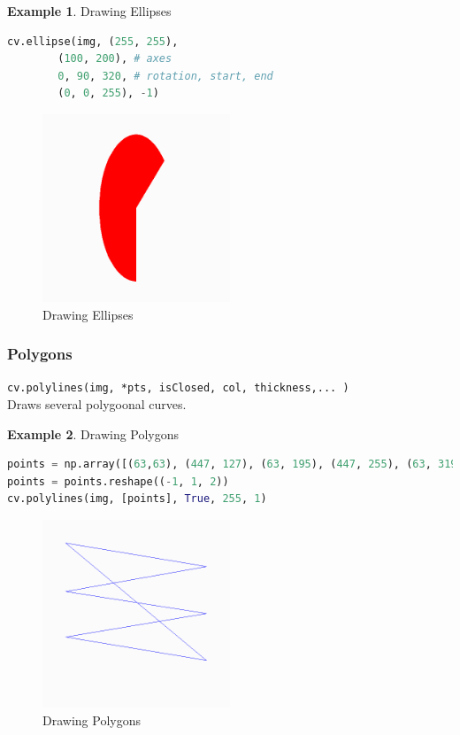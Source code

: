 \documentclass{article}
\theoremstyle{definition}
\newtheorem{ex}{Example}[subsection]
\theoremstyle{remark}
\newcommand{\func}[2]{\noindent\lstinline{#1}\\#2}
\begin{document}
\begin{ex} Drawing Ellipses
\begin{lstlisting}[language=Python]
cv.ellipse(img, (255, 255), 
		(100, 200), # axes
		0, 90, 320, # rotation, start, end
		(0, 0, 255), -1)
\end{lstlisting}
\begin{figure}[h!]
    \centering
    \includegraphics[width=0.5\textwidth]{opencv_elip}
    \caption{Drawing Ellipses}
    \label{fig:ocv_drw_eli}
\end{figure}
\end{ex}

\subsubsection{Polygons}

\func{cv.polylines(img, *pts, isClosed, col, thickness,... )}{Draws several polygoonal curves.}


\begin{ex} Drawing Polygons
\begin{lstlisting}[language=Python]
points = np.array([(63,63), (447, 127), (63, 195), (447, 255), (63, 319), (447, 383)], np.int32)
points = points.reshape((-1, 1, 2))
cv.polylines(img, [points], True, 255, 1)
\end{lstlisting}
\begin{figure}[h!]
    \centering
    \includegraphics[width=0.5\textwidth]{opencv_polylines}
    \caption{Drawing Polygons}
    \label{fig:ocv_drw_pli}
\end{figure}
\end{ex}
\end{document}
